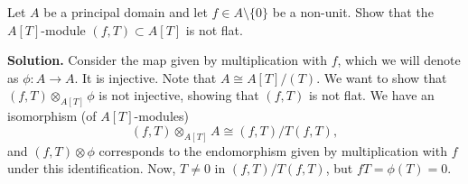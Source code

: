 \documentclass[a4paper,11pt]{article}
\begin{document}
Let $A$ be a principal domain and let $f \in A \setminus \{0\}$ be a 
non-unit. Show that the $A[T]$-module $(f,T) \subset A[T]$ is not flat. 

\textbf{Solution.}
Consider the map given by multiplication with $f$, which we will 
denote as $\phi: A \to A$. It is injective. Note that $A \cong A[T]/(T)$. 
We want to show that $(f,T) \otimes_{A[T]} \phi$ is not injective, 
showing that $(f,T)$ is not flat. We have an isomorphism (of $A[T]$-modules)
$$(f,T) \otimes_{A[T]} A \cong (f,T) / T (f,T),$$
and $(f,T) \otimes \phi$ corresponds to the endomorphism given by multiplication
with $f$ under this identification.
Now, $T \neq 0$ in $(f,T)/T(f,T)$, but $fT = \phi(T) = 0$. 

\contactend
\end{document}
